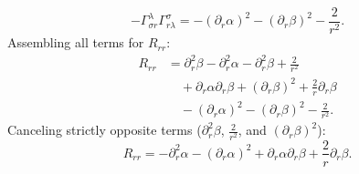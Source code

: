 \documentclass[11pt, a4paper]{report}
\begin{document}
\begin{equation}
-\Gamma^\lambda_{\sigma r} \Gamma^\sigma_{r\lambda} = -(\partial_r\alpha)^2 - (\partial_r\beta)^2 - \frac{2}{r^2}.
\end{equation}
Assembling all terms for $R_{rr}$:
\begin{align}
R_{rr} &= \partial_r^2\beta - \partial_r^2\alpha - \partial_r^2\beta + \frac{2}{r^2} \nonumber \\
&\quad + \partial_r\alpha\partial_r\beta + (\partial_r\beta)^2 + \frac{2}{r}\partial_r\beta \nonumber \\
&\quad - (\partial_r\alpha)^2 - (\partial_r\beta)^2 - \frac{2}{r^2}.
\end{align}
Canceling strictly opposite terms ($\partial_r^2\beta$, $\frac{2}{r^2}$, and $(\partial_r\beta)^2$):
\begin{equation}
R_{rr} = -\partial_r^2\alpha - (\partial_r\alpha)^2 + \partial_r\alpha\partial_r\beta + \frac{2}{r}\partial_r\beta.
\end{equation}
\end{document}
